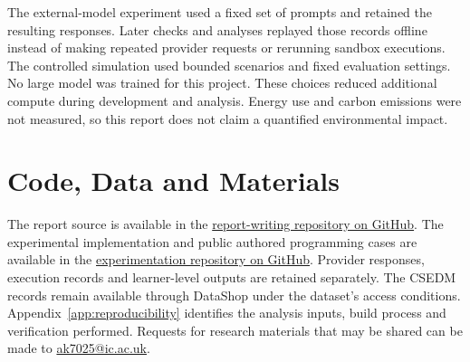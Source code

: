 The external-model experiment used a fixed set of prompts and retained the resulting responses. Later checks and analyses
replayed those records offline instead of making repeated provider requests or rerunning sandbox executions. The controlled
simulation used bounded scenarios and fixed evaluation settings. No large model was trained for this project. These choices
reduced additional compute during development and analysis. Energy use and carbon emissions were not measured, so this report
does not claim a quantified environmental impact.

\section*{Code, Data and Materials}

The report source is available in the
\href{https://github.com/thekhananas/msc-dissertation-report-writing-ak7025}{report-writing repository on GitHub}.
The experimental implementation and public authored programming cases are available in the
\href{https://github.com/thekhananas/msc-dissertation-ak7025}{experimentation repository on GitHub}.
Provider responses, execution records and learner-level outputs are retained separately. The CSEDM records remain available
through DataShop under the dataset's access conditions. Appendix~\ref{app:reproducibility} identifies the analysis inputs, build
process and verification performed. Requests for research materials that may be shared can be made to
\href{mailto:ak7025@ic.ac.uk}{ak7025@ic.ac.uk}.

